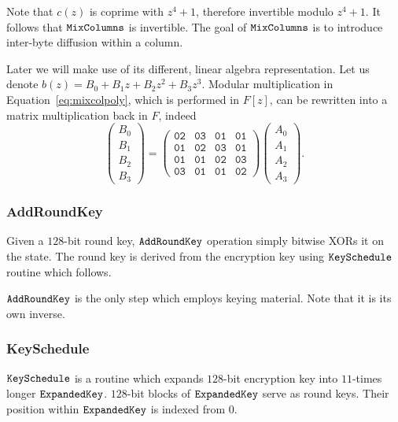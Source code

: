 	Note that $c(z)$ is coprime with $z^4+1$, therefore invertible modulo $z^4+1$. It follows that $\texttt{MixColumns}$ is invertible. The goal of $\texttt{MixColumns}$ is to introduce inter-byte diffusion within a column.
	
	Later we will make use of its different, linear algebra representation. Let us denote $b(z) = B_0 + B_1 z + B_2 z^2 + B_3 z^3$. Modular multiplication in Equation~\ref{eq:mixcolpoly}, which is performed in $F[z]$, can be rewritten into a matrix multiplication back in $F$, indeed
	\begin{equation}
	\label{eq:mixcolmatr}
		\begin{pmatrix}
			B_0 \\ B_1 \\ B_2 \\ B_3
		\end{pmatrix}
		=
		\begin{pmatrix}
			\texttt{02} & \texttt{03} & \texttt{01} & \texttt{01} \\
			\texttt{01} & \texttt{02} & \texttt{03} & \texttt{01} \\
			\texttt{01} & \texttt{01} & \texttt{02} & \texttt{03} \\
			\texttt{03} & \texttt{01} & \texttt{01} & \texttt{02}
		\end{pmatrix}
		\begin{pmatrix}
			A_0 \\ A_1 \\ A_2 \\ A_3
		\end{pmatrix}.
	\end{equation}

\subsubsection{AddRoundKey}
	
	Given a $128$-bit round key, $\texttt{AddRoundKey}$ operation simply bitwise XORs it on the state. The round key is derived from the encryption key using $\texttt{KeySchedule}$ routine which follows.
	
	$\texttt{AddRoundKey}$ is the only step which employs keying material. Note that it is its own inverse.

\subsubsection{KeySchedule}
	
	$\texttt{KeySchedule}$ is a routine which expands $128$-bit encryption key into $11$-times longer $\texttt{ExpandedKey}$. $128$-bit blocks of $\texttt{ExpandedKey}$ serve as round keys. Their position within $\texttt{ExpandedKey}$ is indexed from $0$.
	
